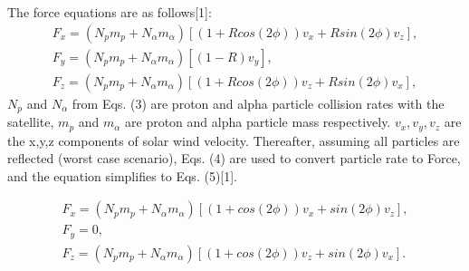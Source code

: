 \documentclass[%
 reprint,
 amsmath,amssymb,
 aps,
]{revtex4-2}
\begin{document}
The force equations are as follows[1]:
\begin{equation}\label{eq:Hanning Window}
\begin{split}
F_{x}=(N_{p}m_{p}+N_{\alpha}m_{\alpha})[(1+Rcos(2\phi))v_{x}+Rsin(2\phi)v_{z}], \\ F_{y}=(N_{p}m_{p}+N_{\alpha}m_{\alpha})[(1-R)v_{y}], \\ F_{z}=(N_{p}m_{p}+N_{\alpha}m_{\alpha})[(1+Rcos(2\phi))v_{z}+Rsin(2\phi)v_{x}],
\end{split}
\end{equation}
 \(N_{p}\) and \(N_{\alpha}\) from Eqs. (3) are proton and alpha particle collision rates with the satellite, \(m_{p}\) and \(m_{\alpha}\) are proton and alpha particle mass respectively. \(v_{x},v_{y},v_{z}\) are the x,y,z components of solar wind velocity. Thereafter, assuming all particles are reflected (worst case scenario), Eqs. (4) are used to convert particle rate to Force, and the equation simplifies to Eqs. (5)[1].
 


\begin{equation}\label{eq:Hanning Window}
\begin{split}
F_{x}=(N_{p}m_{p}+N_{\alpha}m_{\alpha})[(1+cos(2\phi))v_{x}+sin(2\phi)v_{z}], \\ F_{y}=0, \\ F_{z}=(N_{p}m_{p}+N_{\alpha}m_{\alpha})[(1+cos(2\phi))v_{z}+sin(2\phi)v_{x}].
\end{split}
\end{equation}
\end{document}
